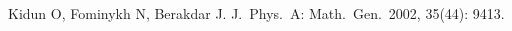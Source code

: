 \documentclass[cs4size,titlepage,twoside]{ctexart}
\begin{document}
\begin{thebibliography}{b}
	Kidun O, Fominykh N, Berakdar J. %
    J.\ Phys.\ A: Math.\ Gen.\, 2002, 35(44): 9413.







\end{thebibliography}
\end{document}
